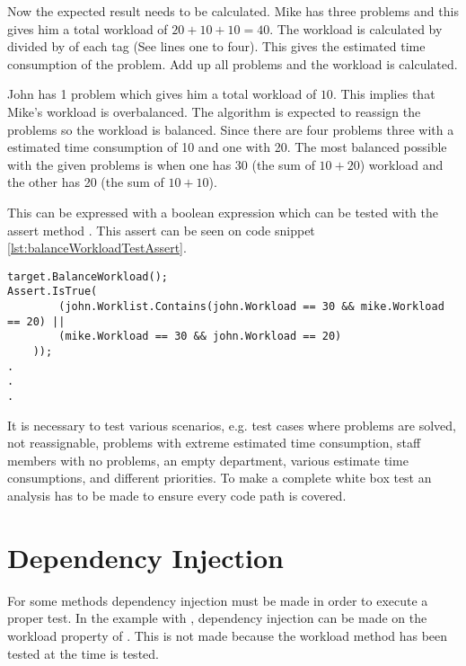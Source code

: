 Now the expected result needs to be calculated. 
Mike has three problems and this gives him a total workload of $20 + 10 + 10 = 40$. The workload is calculated by  divided by  of each tag (See lines one to four).
This gives the estimated time consumption of the problem. Add up all problems and the workload is calculated.

John has 1 problem which gives him a total workload of $10$. 
This implies that Mike's workload is overbalanced. 
The algorithm is expected to reassign the problems so the workload is balanced. 
Since there are four problems three with a estimated time consumption of 10 and one with 20.
The most balanced possible with the given problems is when one has 30 (the sum of $10 + 20$) workload and the other has 20 (the sum of $10 + 10$). 

This can be expressed with a boolean expression which can be tested with the assert method . 
This assert can be seen on code snippet \ref{lst:balanceWorkloadTestAssert}.

\begin{lstlisting}[style=sourceCode, caption=\myCaption{An example unit test which tests a specific instance of the balanceWorkload method.}, label=lst:balanceWorkloadTestAssert,name=src:balance]
target.BalanceWorkload();
Assert.IsTrue(
		(john.Worklist.Contains(john.Workload == 30 && mike.Workload == 20) ||
		(mike.Workload == 30 && john.Workload == 20)
	));
.
.
.
\end{lstlisting}

It is necessary to test various scenarios, e.g. test cases where problems are solved, not reassignable, problems with extreme estimated time consumption, staff members with no problems, an empty department, various estimate time consumptions, and different priorities. To make a complete white box test an analysis has to be made to ensure every code path is covered. 

\section{Dependency Injection}
\label{sec:independencyInjection}
For some methods dependency injection must be made in order to execute a proper test. 
In the example with , dependency injection can be made on the workload property of . 
This is not made because the workload method has been tested at the time  is tested.

